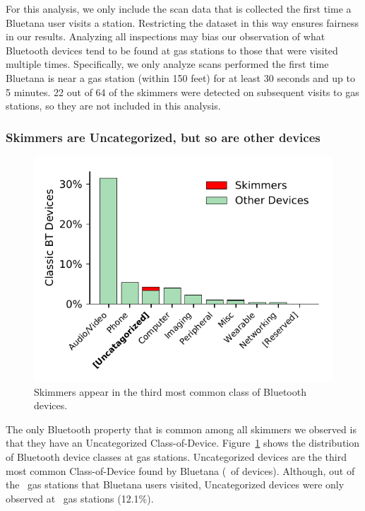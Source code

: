 %
%
For this analysis, we only include the scan data that is collected the first
time a Bluetana user visits a station.
%
Restricting the dataset in this way ensures fairness in our results. Analyzing all
inspections may bias our observation of what Bluetooth devices tend to be found at gas stations to those that
were visited multiple times.
%
Specifically, we only analyze scans
performed the first time Bluetana is near a gas station (within 150 feet) for
at least 30 seconds and up to 5 minutes.
%
22 out of 64 of the skimmers were detected on subsequent
visits to gas stations, so they are not included in this analysis.
% 
%


\subsubsection*{Skimmers are Uncategorized, but so are other devices} %

\begin{figure}
\centering
\includegraphics[width=0.6\linewidth]{skimmer/plots/hist_device_class.pdf}
\caption{
\label{fig:hist_device_class}
Skimmers appear in the third most common class of Bluetooth devices.
}
\end{figure}

The only Bluetooth property that is common among all skimmers we observed is
that they have an Uncategorized Class-of-Device.
%
Figure~\ref{fig:hist_device_class} shows the distribution of Bluetooth device classes at gas stations.
%
Uncategorized devices are the third most common Class-of-Device found by Bluetana (\percentbtuncategorized~of devices).
%
Although, out of the \visitedgasstations~gas stations that Bluetana users visited, Uncategorized devices were only observed at \totaluncatstation~gas stations (12.1\%).

